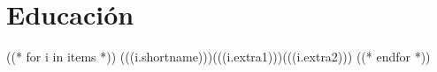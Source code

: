 
\section{Educaci\'on}


((* for i in items *))
%
        {(((i.shortname)))}{(((i.extra1)))}{(((i.extra2)))}
((* endfor *))
